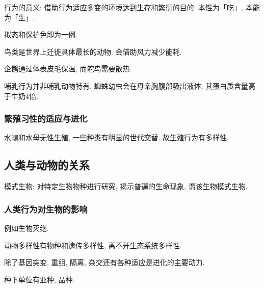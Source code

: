 \documentclass{ctexart}
\begin{document}
行为的意义: 借助行为适应多变的环境达到生存和繁衍的目的. 本性为「吃」, 本能为「生」.
\begin{ex}
    拟态和保护色即为一例.
\end{ex}
\begin{ex}
    鸟类是世界上迁徙具体最长的动物. 会借助风力减少能耗. 
\end{ex}
\begin{ex}
    企鹅通过体表皮毛保温, 而鸵鸟需要散热.
\end{ex}
\begin{ex}
    哺乳行为并非哺乳动物特有. 蜘蛛幼虫会在母亲胸腹部吸出液体, 其蛋白质含量高于牛奶$4$倍.
\end{ex}


\subsubsection{繁殖习性的适应与进化} %
\label{ssub:繁殖习性的适应与进化}

水螅和水母无性生殖, 一些种类有明显的世代交替. 故生殖行为有多样性.



\subsection{人类与动物的关系} %
\label{sub:人类与动物的关系}

模式生物: 对特定生物物种进行研究, 揭示普遍的生命现象, 谓该生物模式生物.

\subsubsection{人类行为对生物的影响} %
\label{ssub:人类行为对生物的影响}

例如生物灭绝.



\begin{cenum}
    \item 动物多样性有物种和遗传多样性, 离不开生态系统多样性.
    \item 除了基因突变, 重组, 隔离, 杂交还有各种适应是进化的主要动力.
    \item 种下单位有亚种, 品种.
\end{cenum}

\end{document}
